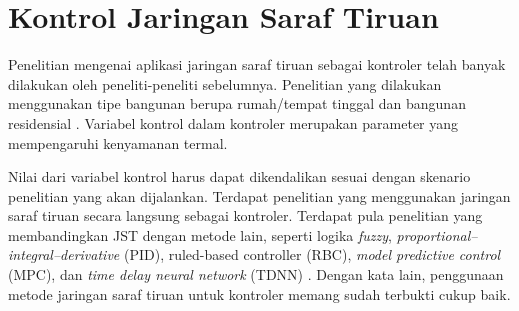 \section{Kontrol Jaringan Saraf Tiruan}

Penelitian mengenai aplikasi jaringan saraf tiruan sebagai kontroler telah banyak dilakukan oleh peneliti-peneliti sebelumnya. Penelitian yang dilakukan menggunakan tipe bangunan berupa rumah/tempat tinggal \cite{paper22JJkim, paper22SKJung} dan bangunan residensial \cite{paper22JanDrgona}. Variabel kontrol dalam kontroler merupakan parameter yang mempengaruhi kenyamanan termal.

Nilai dari variabel kontrol harus dapat dikendalikan sesuai dengan skenario penelitian yang akan dijalankan. Terdapat penelitian yang menggunakan jaringan saraf tiruan secara langsung sebagai kontroler. Terdapat pula penelitian yang membandingkan JST dengan metode lain, seperti logika \textit{fuzzy}, \textit{proportional–integral–derivative} (PID), ruled-based controller (RBC), \textit{model predictive control} (MPC), dan \textit{time delay neural network} (TDNN) \cite{paper22JanDrgona}. Dengan kata lain, penggunaan metode jaringan saraf tiruan untuk kontroler memang sudah terbukti cukup baik.


